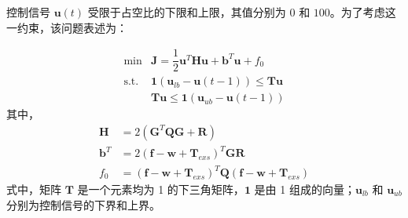 控制信号 $\boldsymbol{u}(t)$ 受限于占空比的下限和上限，其值分别为 $0$ 和 $100$。为了考虑这一约束，该问题表述为：\par
\begin{equation}
    \begin{array}{cl}
    \text{min} &\boldsymbol{J}=\dfrac{1}{2}\mathbf{u}^{T} \mathbf{H} \mathbf{u}+\mathbf{b}^{T} \mathbf{u}+f_{0}\\
    \text{s.t.} &\mathbf{1}(\boldsymbol{u}_{lb}-\boldsymbol{u}(t-1))\leq \mathbf{Tu}\\
    &\mathbf{Tu}\leq \mathbf{1}(\boldsymbol{u}_{ub}-\boldsymbol{u}(t-1))
    \end{array}
\end{equation}
其中，
\begin{equation}
    \begin{aligned}
        \mathbf{H} &= 2\left(\mathbf{G}^{T}\mathbf{Q}\mathbf{G}+\mathbf{R}\right)\\
        \mathbf{b}^{T} &= 2(\mathbf{f}-\mathbf{w}+\mathbf{T}_{exs})^{T} \mathbf{G} \mathbf{R}\\
        f_{0} &= (\mathbf{f}-\mathbf{w}+\mathbf{T}_{exs})^{T} \mathbf{Q} (\mathbf{f}-\mathbf{w}+\mathbf{T}_{exs})
    \end{aligned}
\end{equation}
式中，矩阵 $\mathbf{T}$ 是一个元素均为 1 的下三角矩阵，$\mathbf{1}$ 是由 1 组成的向量；$\boldsymbol{u}_{lb}$ 和 $\boldsymbol{u}_{ub}$ 分别为控制信号的下界和上界。\par

